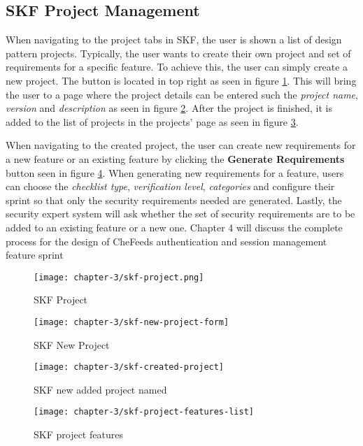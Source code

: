 \subsection{SKF Project Management}
When navigating to the project tabs in SKF, the user is shown a list of design pattern projects. Typically, the user wants to create their own project and set of requirements for a specific feature. To achieve this, the user can simply create a new project. The button is located in top right as seen in figure \ref{fig:skf-project}. This will bring the user to a page where the project details can be entered such the \emph{project name}, \emph{version} and \emph{description} as seen in figure \ref{fig:skf-new-project}. After the project is finished, it is added to the list of projects in the projects' page as seen in figure \ref{fig:skf-test-project}. 

When navigating to the created project, the user can create new requirements for a new feature or an existing feature by clicking the \textbf{Generate Requirements} button seen in figure \ref{fig:skf-project-features}. When generating new requirements for a feature, users can choose the \emph{checklist type}, \emph{verification level}, \emph{categories} and configure their sprint so that only the security requirements needed are generated. Lastly, the security expert system will ask whether the set of security requirements are to be added to an existing feature or a new one. Chapter 4 will discuss the complete process for the design of CheFeeds authentication and session management feature sprint

\begin{figure}[!b]
    \centering
    \texttt{[image: chapter-3/skf-project.png]}
    \caption{SKF Project}
    \label{fig:skf-project}
\end{figure}

\begin{figure}
    \centering
    \texttt{[image: chapter-3/skf-new-project-form]}
    \caption{SKF New Project}
    \label{fig:skf-new-project}
\end{figure}

\begin{figure}
    \centering
    \texttt{[image: chapter-3/skf-created-project]}
    \caption{SKF new added project named }
    \label{fig:skf-test-project}
\end{figure}

\begin{figure}
    \centering
    \texttt{[image: chapter-3/skf-project-features-list]}
    \caption{SKF project features}
    \label{fig:skf-project-features}
\end{figure}

